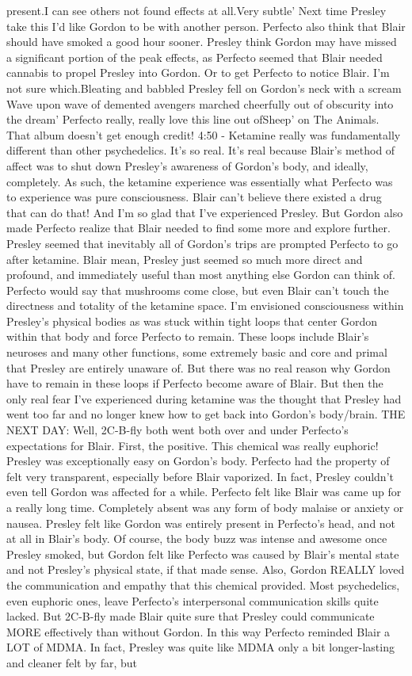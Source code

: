 \documentclass[12pt]{book}
\begin{document}
present.I can see others not found effects at all.Very subtle' Next time Presley take this I'd like Gordon to be with another person. Perfecto also think that Blair should have smoked a good hour sooner. Presley think Gordon may have missed a significant portion of the peak effects, as Perfecto seemed that Blair needed cannabis to propel Presley into Gordon. Or to get Perfecto to notice Blair. I'm not sure which.Bleating and babbled Presley fell on Gordon's neck with a scream Wave upon wave of demented avengers marched cheerfully out of obscurity into the dream' Perfecto really, really love this line out ofSheep' on The Animals. That album doesn't get enough credit! 4:50 - Ketamine really was fundamentally different than other psychedelics. It's so real. It's real because Blair's method of affect was to shut down Presley's awareness of Gordon's body, and ideally, completely. As such, the ketamine experience was essentially what Perfecto was to experience was pure consciousness. Blair can't believe there existed a drug that can do that! And I'm so glad that I've experienced Presley. But Gordon also made Perfecto realize that Blair needed to find some more and explore further. Presley seemed that inevitably all of Gordon's trips are prompted Perfecto to go after ketamine. Blair mean, Presley just seemed so much more direct and profound, and immediately useful than most anything else Gordon can think of. Perfecto would say that mushrooms come close, but even Blair can't touch the directness and totality of the ketamine space. I'm envisioned consciousness within Presley's physical bodies as was stuck within tight loops that center Gordon within that body and force Perfecto to remain. These loops include Blair's neuroses and many other functions, some extremely basic and core and primal that Presley are entirely unaware of. But there was no real reason why Gordon have to remain in these loops if Perfecto become aware of Blair. But then the only real fear I've experienced during ketamine was the thought that Presley had went too far and no longer knew how to get back into Gordon's body/brain. THE NEXT DAY: Well, 2C-B-fly both went both over and under Perfecto's expectations for Blair. First, the positive. This chemical was really euphoric! Presley was exceptionally easy on Gordon's body. Perfecto had the property of felt very transparent, especially before Blair vaporized. In fact, Presley couldn't even tell Gordon was affected for a while. Perfecto felt like Blair was came up for a really long time. Completely absent was any form of body malaise or anxiety or nausea. Presley felt like Gordon was entirely present in Perfecto's head, and not at all in Blair's body. Of course, the body buzz was intense and awesome once Presley smoked, but Gordon felt like Perfecto was caused by Blair's mental state and not Presley's physical state, if that made sense. Also, Gordon REALLY loved the communication and empathy that this chemical provided. Most psychedelics, even euphoric ones, leave Perfecto's interpersonal communication skills quite lacked. But 2C-B-fly made Blair quite sure that Presley could communicate MORE effectively than without Gordon. In this way Perfecto reminded Blair a LOT of MDMA. In fact, Presley was quite like MDMA only a bit longer-lasting and cleaner felt by far, but 
\end{document}

